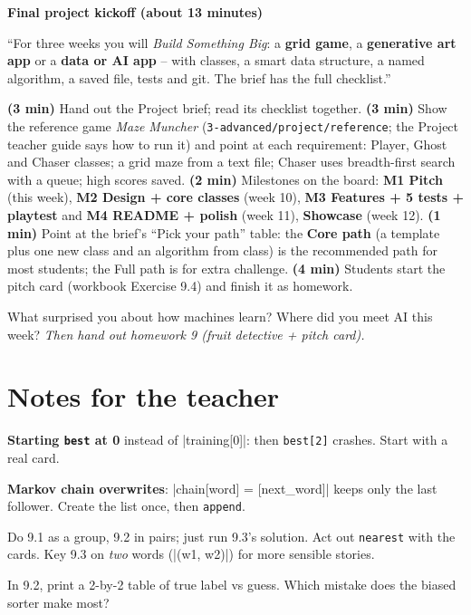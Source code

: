 \textbf{Final project kickoff (about 13 minutes)}
\begin{teacherscript}
\enquote{For three weeks you will \emph{Build Something Big}: a \textbf{grid game}, a \textbf{generative art app} or a \textbf{data or AI app} -- with classes, a smart data structure, a named algorithm, a saved file, tests and git. The brief has the full checklist.}
\end{teacherscript}
\textbf{(3 min)} Hand out the Project brief; read its checklist together. \textbf{(3 min)} Show the reference game \emph{Maze Muncher} (\texttt{3-advanced/project/reference}; the Project teacher guide says how to run it) and point at each requirement: Player, Ghost and Chaser classes; a grid maze from a text file; Chaser uses breadth-first search with a queue; high scores saved. \textbf{(2 min)} Milestones on the board: \textbf{M1 Pitch} (this week), \textbf{M2 Design + core classes} (week 10), \textbf{M3 Features + 5 tests + playtest} and \textbf{M4 README + polish} (week 11), \textbf{Showcase} (week 12). \textbf{(1 min)} Point at the brief's \enquote{Pick your path} table: the \textbf{Core path} (a template plus one new class and an algorithm from class) is the recommended path for most students; the Full path is for extra challenge. \textbf{(4 min)} Students start the pitch card (workbook Exercise 9.4) and finish it as homework.

\begin{reflection}
What surprised you about how machines learn? Where did you meet AI this week? \emph{Then hand out homework 9 (fruit detective + pitch card).}
\end{reflection}

\section{Notes for the teacher}
\begin{commonmistakes}
  \item \textbf{Starting \texttt{best} at 0} instead of \py|training[0]|: then \texttt{best[2]} crashes. Start with a real card.
  \item \textbf{Markov chain overwrites}: \py|chain[word] = [next_word]| keeps only the last follower. Create the list once, then \texttt{append}.
\end{commonmistakes}

\begin{differentiation}
\supportpath Do 9.1 as a group, 9.2 in pairs; just run 9.3's solution. Act out \texttt{nearest} with the cards.
\extensionpath Key 9.3 on \emph{two} words (\py|(w1, w2)|) for more sensible stories.
\end{differentiation}

\begin{stretchchallenge}
In 9.2, print a 2-by-2 table of true label vs guess. Which mistake does the biased sorter make most?
\end{stretchchallenge}
